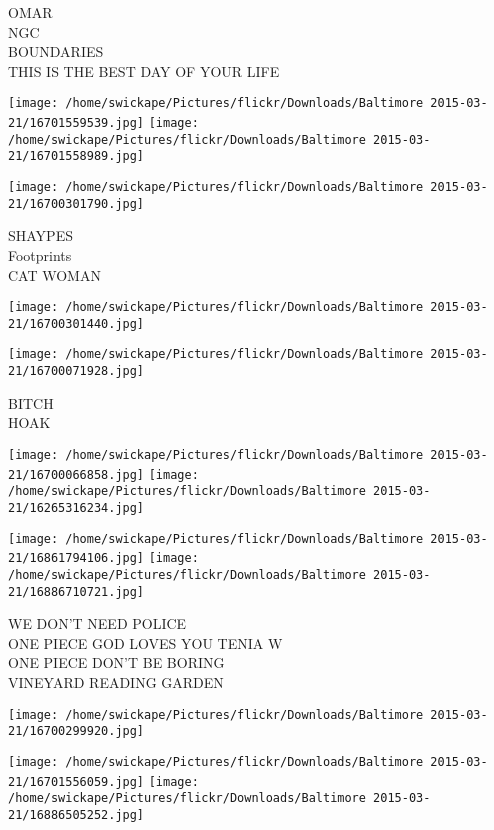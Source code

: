 \documentclass[10pt,letterpaper]{article}
\begin{document}
OMAR\\
NGC\\
BOUNDARIES\\
THIS IS THE BEST DAY OF YOUR LIFE
\pagebreak

\texttt{[image: /home/swickape/Pictures/flickr/Downloads/Baltimore 2015-03-21/16701559539.jpg]}
\texttt{[image: /home/swickape/Pictures/flickr/Downloads/Baltimore 2015-03-21/16701558989.jpg]}

\vspace{0.25in}
\texttt{[image: /home/swickape/Pictures/flickr/Downloads/Baltimore 2015-03-21/16700301790.jpg]}

SHAYPES\\
Footprints\\
CAT WOMAN
\pagebreak

\texttt{[image: /home/swickape/Pictures/flickr/Downloads/Baltimore 2015-03-21/16700301440.jpg]}

\vspace{0.25in}
\texttt{[image: /home/swickape/Pictures/flickr/Downloads/Baltimore 2015-03-21/16700071928.jpg]}

BITCH\\
HOAK
\pagebreak

\texttt{[image: /home/swickape/Pictures/flickr/Downloads/Baltimore 2015-03-21/16700066858.jpg]}
\texttt{[image: /home/swickape/Pictures/flickr/Downloads/Baltimore 2015-03-21/16265316234.jpg]}

\texttt{[image: /home/swickape/Pictures/flickr/Downloads/Baltimore 2015-03-21/16861794106.jpg]}
\texttt{[image: /home/swickape/Pictures/flickr/Downloads/Baltimore 2015-03-21/16886710721.jpg]}

WE DON'T NEED POLICE\\
ONE PIECE GOD LOVES YOU TENIA W\\
ONE PIECE DON'T BE BORING\\
VINEYARD READING GARDEN
\pagebreak

\texttt{[image: /home/swickape/Pictures/flickr/Downloads/Baltimore 2015-03-21/16700299920.jpg]}

\vspace{0.25in}
\texttt{[image: /home/swickape/Pictures/flickr/Downloads/Baltimore 2015-03-21/16701556059.jpg]}
\texttt{[image: /home/swickape/Pictures/flickr/Downloads/Baltimore 2015-03-21/16886505252.jpg]}
\end{document}
